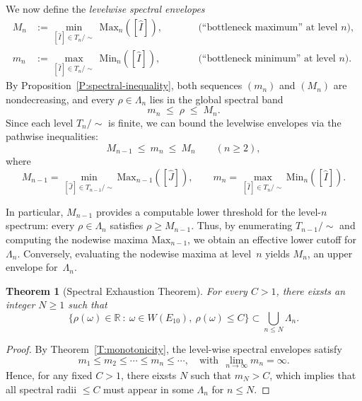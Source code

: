 \documentclass[11pt]{amsart}
\numberwithin{equation}{section}
\newtheorem{thm}{Theorem}[section]
\newcommand{\Max}{\mathrm{Max}}
\newcommand{\Min}{\mathrm{Min}}
\begin{document}
We now define the \emph{levelwise spectral envelopes}
\[
\begin{aligned}
M_n &:= \min_{[\widehat I]\in T_n/\!\sim}\ \Max_n([\widehat I]),
&\qquad&\text{(``bottleneck maximum'' at level $n$)},\\
m_n &:= \max_{[\widehat I]\in T_n/\!\sim}\ \Min_n([\widehat I]),
&\qquad&\text{(``bottleneck minimum'' at level $n$)}.
\end{aligned}
\]
By Proposition~\ref{P:spectral-inequality}, both sequences $(m_n)$ and $(M_n)$ are nondecreasing,
and every $\rho\in\Lambda_n$ lies in the global spectral band
\[
m_n \;\le\; \rho \;\le\; M_n.
\]
Since each level $T_n/\!\sim$ is finite, we can bound the levelwise envelopes
via the pathwise inequalities:
\[
M_{n-1}\ \le\ m_n\ \le\ M_n
\qquad(n\ge 2),
\]
where
\[
M_{n-1}=\min_{[\widehat J]\in T_{n-1}/\!\sim}\Max_{n-1}([\widehat J]),
\qquad
m_n=\max_{[\widehat I]\in T_n/\!\sim}\Min_n([\widehat I]).
\]

\medskip
In particular, $M_{n-1}$ provides a computable lower threshold for the
level-$n$ spectrum: every $\rho\in\Lambda_n$ satisfies $\rho\ge M_{n-1}$.
Thus, by enumerating $T_{n-1}/\!\sim$ and computing the nodewise maxima
$\Max_{n-1}$, we obtain an effective lower cutoff for~$\Lambda_n$.
Conversely, evaluating the nodewise maxima at level~$n$ yields
$M_n$, an upper envelope for~$\Lambda_n$.

\begin{thm}[Spectral Exhaustion Theorem]\label{T:exhaustion} For every $C >1$, there eixsts an integer $N\ge 1$ such that
\[ \{ \rho(\omega) \in \mathbb{R}\ :\ \omega \in W(E_{10}), \ \rho(\omega)\le C\} \subset \bigcup_{n\le N} \Lambda_n. \]
\end{thm}

\begin{proof}
By Theorem~\ref{T:monotonicity}, the level-wise spectral envelopes satisfy 
\[ m_1 \le m_2 \le \cdots \le m_n \le \cdots, \quad \text{with}\ \ \lim_{n \to \infty} m_n = \infty.\]
Hence, for any fixed $C>1$, there eixsts $N$ such that $m_N>C$, which implies that all spectral radii $\le C$ must appear in some $\Lambda_n$ for $n\le N$.
\end{proof}
\end{document}
